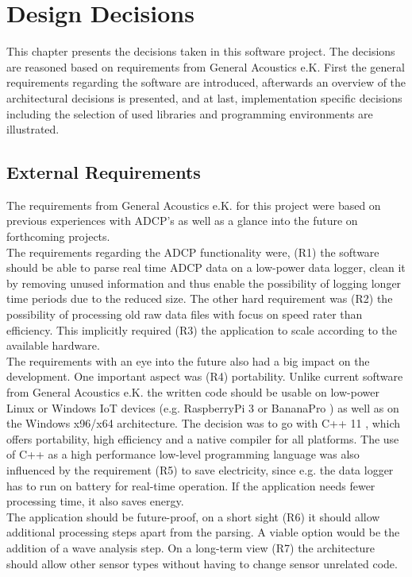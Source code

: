 
\chapter{Design Decisions}
This chapter presents the decisions taken in this software project. The decisions are reasoned based on requirements from General Acoustics e.K. First the general requirements regarding the software are introduced, afterwards an overview of the architectural decisions is presented, and at last, implementation specific decisions including the selection of used libraries and programming environments are illustrated. 
\section{External Requirements}
The requirements from General Acoustics e.K. for this project were based on previous experiences with ADCP's as well as a glance into the future on forthcoming projects.\\ 
The requirements regarding the ADCP functionality were, (R1) the software should be able to parse real time ADCP data on a low-power data logger, clean it by removing unused information and thus enable the possibility of logging longer time periods due to the reduced size. The other hard requirement was (R2) the possibility of processing old raw data files with focus on speed rater than efficiency. This implicitly required (R3) the application to scale according to the available hardware.\\ 
The requirements with an eye into the future also had a big impact on the development. One important aspect was (R4) portability. Unlike current software from General Acoustics e.K. the written code should be usable on low-power Linux or Windows IoT devices (e.g. RaspberryPi 3 \cite{raspberry} or BananaPro \cite{bananapro}) as well as on the Windows x96/x64 architecture. The decision was to go with C++ 11 \cite{cpp_11}, which offers portability, high efficiency and a native compiler for all platforms. The use of C++ as a high performance low-level programming language was also influenced by the requirement (R5) to save electricity, since e.g. the data logger has to run on battery for real-time operation. If the application needs fewer processing time, it also saves energy. \\
The application should be future-proof, on a short sight (R6) it should allow additional processing steps apart from the parsing. A viable option would be the addition of a wave analysis step. On a long-term view (R7) the architecture should allow other sensor types without having to change sensor unrelated code.

